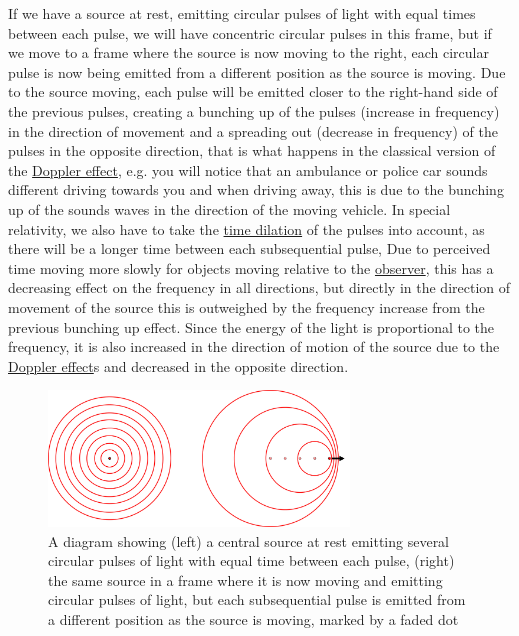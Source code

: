 If we have a source at rest, emitting circular pulses of light with equal times between each pulse, we will have concentric circular pulses in this frame, but if we move to a frame where the source is now moving to the right, each circular pulse is now being emitted from a different position as the source is moving. Due to the source moving, each pulse will be emitted closer to the right-hand side of the previous pulses, creating a bunching up of the pulses (increase in frequency) in the direction of movement and a spreading out (decrease in frequency) of the pulses in the opposite direction, that is what happens in the classical version of the \hyperlink{def-doppler-effect}{Doppler effect}, e.g. you will notice that an ambulance or police car sounds different driving towards you and when driving away, this is due to the bunching up of the sounds waves in the direction of the moving vehicle. In special relativity, we also have to take the \hyperlink{def-time-dilation}{time dilation} of the pulses into account, as there will be a longer time between each subsequential pulse, Due to perceived time moving more slowly for objects moving relative to the \hyperlink{def-observer}{observer}, this has a decreasing effect on the frequency in all directions, but directly in the direction of movement of the source this is outweighed by the frequency increase from the previous bunching up effect. Since the energy of the light is proportional to the frequency, it is also increased in the direction of motion of the source due to the \hyperlink{def-doppler-effect}{Doppler effect}s and decreased in the opposite direction.

\begin{figure}[H]
	\centering
	\includegraphics[width=8cm]{images/pdf/Doppler.pdf}
	\caption{A diagram showing (left) a central source at rest emitting several circular pulses of light with equal time between each pulse, (right) the same source in a frame where it is now moving and emitting circular pulses of light, but each subsequential pulse is emitted from a different position as the source is moving, marked by a faded dot}
	\label{fig: doppler effect intro}
\end{figure}

